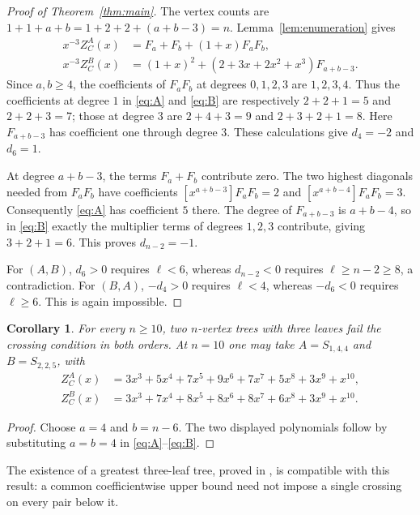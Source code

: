 \documentclass[11pt]{article}
\newtheorem{corollary}[theorem]{Corollary}
\newcommand{\ZC}{Z_C}
\begin{document}
\begin{proof}[Proof of Theorem~\ref{thm:main}]
The vertex counts are $1+1+a+b=1+2+2+(a+b-3)=n$.
Lemma~\ref{lem:enumeration} gives
\begin{align}
x^{-3}\ZC^A(x)&=F_a+F_b+(1+x)F_aF_b,\label{eq:A}\\
x^{-3}\ZC^B(x)&=(1+x)^2+(2+3x+2x^2+x^3)F_{a+b-3}.\label{eq:B}
\end{align}
Since $a,b\geq4$, the coefficients of $F_aF_b$ at degrees $0,1,2,3$
are $1,2,3,4$. Thus the coefficients at degree $1$ in
\eqref{eq:A} and \eqref{eq:B} are respectively $2+2+1=5$ and
$2+2+3=7$; those at degree $3$ are $2+4+3=9$ and $2+3+2+1=8$.
Here $F_{a+b-3}$ has coefficient one through degree $3$.
These calculations give $d_4=-2$ and $d_6=1$.

At degree $a+b-3$, the terms $F_a+F_b$ contribute zero.
The two highest diagonals needed from $F_aF_b$ have coefficients
$[x^{a+b-3}]F_aF_b=2$ and $[x^{a+b-4}]F_aF_b=3$.
Consequently \eqref{eq:A} has coefficient $5$ there.
The degree of $F_{a+b-3}$ is $a+b-4$, so in \eqref{eq:B} exactly
the multiplier terms of degrees $1,2,3$ contribute, giving $3+2+1=6$.
This proves $d_{n-2}=-1$.

For $(A,B)$, $d_6>0$ requires $\ell<6$, whereas $d_{n-2}<0$
requires $\ell\geq n-2\geq8$, a contradiction.
For $(B,A)$, $-d_4>0$ requires $\ell<4$, whereas $-d_6<0$
requires $\ell\geq6$. This is again impossible.
\end{proof}

\begin{corollary}\label{cor:allorders}
For every $n\geq10$, two $n$-vertex trees with three leaves fail the
crossing condition in both orders. At $n=10$ one may take
$A=S_{1,4,4}$ and $B=S_{2,2,5}$, with
\begin{align*}
\ZC^A(x)&=3x^3+5x^4+7x^5+9x^6+7x^7+5x^8+3x^9+x^{10},\\
\ZC^B(x)&=3x^3+7x^4+8x^5+8x^6+8x^7+6x^8+3x^9+x^{10}.
\end{align*}
\end{corollary}
\begin{proof}
Choose $a=4$ and $b=n-6$. The two displayed polynomials follow by
substituting $a=b=4$ in \eqref{eq:A}--\eqref{eq:B}.
\end{proof}
The existence of a greatest three-leaf tree, proved in
\cite[Corollary 4.12]{MR}, is compatible with this result:
a common coefficientwise upper bound need not impose a single crossing
on every pair below it.
\end{document}
